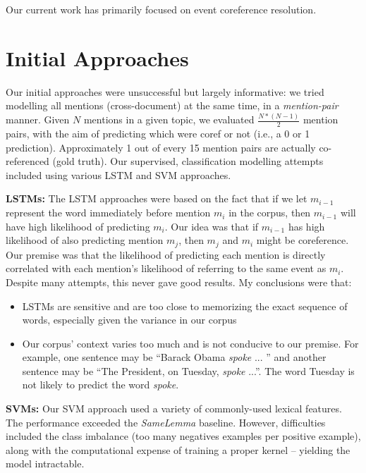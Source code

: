 \label{sec:coreference}

Our current work has primarily focused on event coreference resolution.

\section{Initial Approaches}
Our initial approaches were unsuccessful but largely informative: we tried modelling all mentions (cross-document) at the same time, in a \textit{mention-pair} manner.  Given $N$ mentions in a given topic, we evaluated $\frac{N*(N-1)}{2}$ mention pairs, with the aim of predicting which were coref or not (i.e., a 0 or 1 prediction).  Approximately 1 out of every 15 mention pairs are actually co-referenced (gold truth).  Our supervised, classification modelling attempts included using various LSTM and SVM approaches.


\textbf{LSTMs:} The LSTM approaches were based on the fact that if we let $m_{i-1}$ represent the word immediately before mention $m_{i}$ in the corpus, then $m_{i-1}$ will have high likelihood of predicting $m_{i}$.  Our idea was that if $m_{i-1}$ has high likelihood of also predicting mention $m_{j}$, then $m_{j}$ and $m_{i}$ might be coreference.  Our premise was that the likelihood of predicting each mention is directly correlated with each mention's likelihood of referring to the same event as $m_{i}$.  Despite many attempts, this never gave good results.  My conclusions were that:

\begin{itemize}
\item LSTMs are sensitive and are too close to memorizing the exact sequence of words, especially given the variance in our corpus
\item Our corpus' context varies too much and is not conducive to our premise.  For example, one sentence may be ``Barack Obama \textit{spoke} ... '' and another sentence may be ``The President, on Tuesday, \textit{spoke} ...''.  The word Tuesday is not likely to predict the word \textit{spoke}.
\end{itemize}

\textbf{SVMs:} Our SVM approach used a variety of commonly-used lexical features.  The performance exceeded the \textit{SameLemma} baseline.  However, difficulties included the class imbalance (too many negatives examples per positive example), along with the computational expense of training a proper kernel -- yielding the model intractable.

